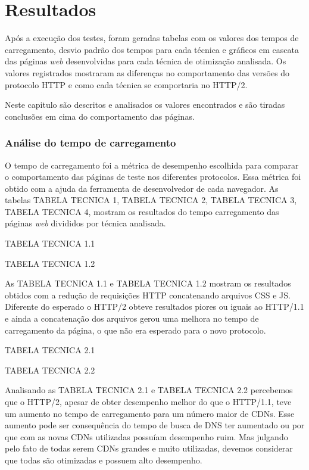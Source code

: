 %
%

\chapter{Resultados}

Após a execução dos testes, foram geradas tabelas com os valores dos tempos de carregamento, desvio padrão dos tempos para cada técnica e gráficos em cascata das páginas \textit{web} desenvolvidas para cada técnica de otimização analisada. Os valores registrados mostraram as diferenças no comportamento das versões do protocolo HTTP e como cada técnica se comportaria no HTTP/2.

Neste capitulo são descritos e analisados os valores encontrados e são tiradas conclusões em cima do comportamento das páginas.

\subsection{Análise do tempo de carregamento}
\label{analisedotempodecarregamento}

O tempo de carregamento foi a métrica de desempenho escolhida para comparar o comportamento das páginas de teste nos diferentes protocolos. Essa métrica foi obtido com a ajuda da ferramenta de desenvolvedor de cada navegador. As tabelas TABELA TECNICA 1, TABELA TECNICA 2, TABELA TECNICA 3, TABELA TECNICA 4, mostram os resultados do tempo carregamento das páginas \textit{web} divididos por técnica analisada.

TABELA TECNICA 1.1

TABELA TECNICA 1.2

As TABELA TECNICA 1.1 e TABELA TECNICA 1.2 mostram os resultados obtidos com a redução de requisições HTTP concatenando arquivos CSS e JS. Diferente do esperado o HTTP/2 obteve resultados piores ou iguais ao HTTP/1.1 e ainda a concatenação dos arquivos gerou uma melhora no tempo de carregamento da página, o que não era esperado para o novo protocolo.

TABELA TECNICA 2.1

TABELA TECNICA 2.2

Analisando as TABELA TECNICA 2.1 e TABELA TECNICA 2.2 percebemos que o HTTP/2, apesar de obter desempenho melhor do que o HTTP/1.1, teve um aumento no tempo de carregamento para um número maior de CDNs. Esse aumento pode ser consequência do tempo de busca de DNS ter aumentado ou por que com as novas CDNs utilizadas possuíam desempenho ruim. Mas julgando pelo fato de todas serem CDNs grandes e muito utilizadas, devemos considerar que todas são otimizadas e possuem alto desempenho. 

